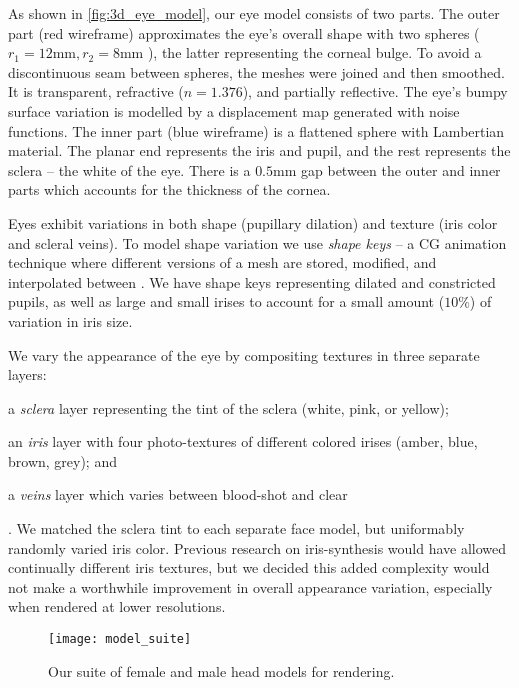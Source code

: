 As shown in \autoref{fig:3d_eye_model}, our eye model consists of two parts.
%
The outer part (red wireframe) approximates the eye's overall shape with two spheres ($r_1\!=\!12\textrm{mm}, r_2\!=\!8\textrm{mm}$ \cite{ruhland2014look}), the latter representing the corneal bulge. To avoid a discontinuous seam between spheres, the meshes were joined and then smoothed. It is transparent, refractive ($n\!=\!1.376$), and partially reflective. The eye's bumpy surface variation is modelled by a displacement map generated with noise functions.
%
The inner part (blue wireframe) is a flattened sphere with Lambertian material. The planar end represents the iris and pupil, and the rest represents the sclera -- the white of the eye.
%
There is a $0.5\textrm{mm}$ gap between the outer and inner parts which accounts for the thickness of the cornea. 

Eyes exhibit variations in both shape (pupillary dilation) and texture (iris color and scleral veins). To model shape variation we use \emph{shape keys} -- a CG animation technique where different versions of a mesh are stored, modified, and interpolated between \cite{orvalho2012facial}. We have shape keys representing dilated and constricted pupils, as well as large and small irises to account for a small amount ($10\%$) of variation in iris size.

We vary the appearance of the eye by compositing textures in three separate layers:
\begin{inparaenum}
\item a \emph{sclera} layer representing the tint of the sclera (white, pink, or yellow);
\item an \emph{iris} layer with four photo-textures of different colored irises (amber, blue, brown, grey); and
\item a \emph{veins} layer which varies between blood-shot and clear
\end{inparaenum}. We matched the sclera tint to each separate face model, but uniformably randomly varied iris color. Previous research on iris-synthesis  would have allowed continually different iris textures, but we decided this added complexity would not make a worthwhile improvement in overall appearance variation, especially when rendered at lower resolutions.

\begin{figure*}
    \texttt{[image: model\_suite]}
    \caption{Our suite of female and male head models for rendering.}
    \label{fig:model_suite}
\end{figure*}

